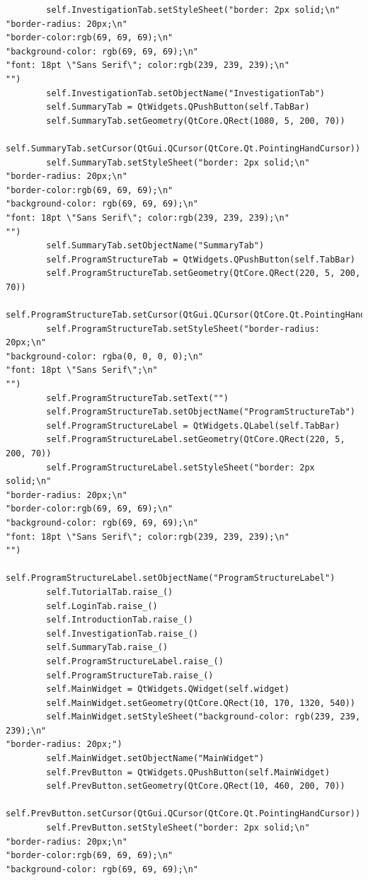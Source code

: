 \documentclass[12pt]{article}
\begin{document}
\begin{lstlisting}
        self.InvestigationTab.setStyleSheet("border: 2px solid;\n"
"border-radius: 20px;\n"
"border-color:rgb(69, 69, 69);\n"
"background-color: rgb(69, 69, 69);\n"
"font: 18pt \"Sans Serif\"; color:rgb(239, 239, 239);\n"
"")
        self.InvestigationTab.setObjectName("InvestigationTab")
        self.SummaryTab = QtWidgets.QPushButton(self.TabBar)
        self.SummaryTab.setGeometry(QtCore.QRect(1080, 5, 200, 70))
        self.SummaryTab.setCursor(QtGui.QCursor(QtCore.Qt.PointingHandCursor))
        self.SummaryTab.setStyleSheet("border: 2px solid;\n"
"border-radius: 20px;\n"
"border-color:rgb(69, 69, 69);\n"
"background-color: rgb(69, 69, 69);\n"
"font: 18pt \"Sans Serif\"; color:rgb(239, 239, 239);\n"
"")
        self.SummaryTab.setObjectName("SummaryTab")
        self.ProgramStructureTab = QtWidgets.QPushButton(self.TabBar)
        self.ProgramStructureTab.setGeometry(QtCore.QRect(220, 5, 200, 70))
        self.ProgramStructureTab.setCursor(QtGui.QCursor(QtCore.Qt.PointingHandCursor))
        self.ProgramStructureTab.setStyleSheet("border-radius: 20px;\n"
"background-color: rgba(0, 0, 0, 0);\n"
"font: 18pt \"Sans Serif\";\n"
"")
        self.ProgramStructureTab.setText("")
        self.ProgramStructureTab.setObjectName("ProgramStructureTab")
        self.ProgramStructureLabel = QtWidgets.QLabel(self.TabBar)
        self.ProgramStructureLabel.setGeometry(QtCore.QRect(220, 5, 200, 70))
        self.ProgramStructureLabel.setStyleSheet("border: 2px solid;\n"
"border-radius: 20px;\n"
"border-color:rgb(69, 69, 69);\n"
"background-color: rgb(69, 69, 69);\n"
"font: 18pt \"Sans Serif\"; color:rgb(239, 239, 239);\n"
"")
        self.ProgramStructureLabel.setObjectName("ProgramStructureLabel")
        self.TutorialTab.raise_()
        self.LoginTab.raise_()
        self.IntroductionTab.raise_()
        self.InvestigationTab.raise_()
        self.SummaryTab.raise_()
        self.ProgramStructureLabel.raise_()
        self.ProgramStructureTab.raise_()
        self.MainWidget = QtWidgets.QWidget(self.widget)
        self.MainWidget.setGeometry(QtCore.QRect(10, 170, 1320, 540))
        self.MainWidget.setStyleSheet("background-color: rgb(239, 239, 239);\n"
"border-radius: 20px;")
        self.MainWidget.setObjectName("MainWidget")
        self.PrevButton = QtWidgets.QPushButton(self.MainWidget)
        self.PrevButton.setGeometry(QtCore.QRect(10, 460, 200, 70))
        self.PrevButton.setCursor(QtGui.QCursor(QtCore.Qt.PointingHandCursor))
        self.PrevButton.setStyleSheet("border: 2px solid;\n"
"border-radius: 20px;\n"
"border-color:rgb(69, 69, 69);\n"
"background-color: rgb(69, 69, 69);\n"

\end{lstlisting}
\end{document}
